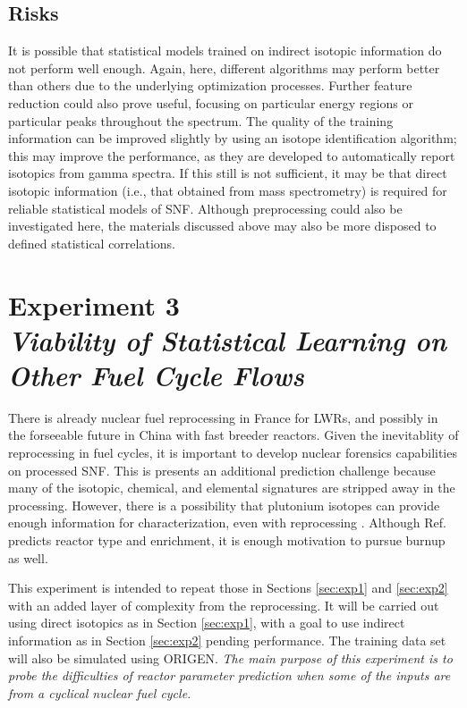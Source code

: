 \subsection*{Risks}

It is possible that statistical models trained on indirect isotopic information
do not perform well enough. Again, here, different algorithms may perform
better than others due to the underlying optimization processes. Further
feature reduction could also prove useful, focusing on particular energy
regions or particular peaks throughout the spectrum. The quality of the
training information can be improved slightly by using an isotope
identification algorithm; this may improve the performance, as they are
developed to automatically report isotopics from gamma spectra. If this still
is not sufficient, it may be that direct isotopic information (i.e., that
obtained from mass spectrometry) is required for reliable statistical models of
\gls{SNF}.  Although preprocessing could also be investigated here, the
materials discussed above may also be more disposed to defined statistical
correlations.

\section[Experiment 3: Other Fuel Cycle Flows]{Experiment 3\\ 
\large{\textit{Viability of Statistical Learning on Other Fuel Cycle Flows}}}
\label{sec:exp3}

There is already nuclear fuel reprocessing in France for \gls{LWR}s, and
possibly in the forseeable future in China with fast breeder reactors.  Given
the inevitablity of reprocessing in fuel cycles, it is important to develop
nuclear forensics capabilities on processed \gls{SNF}. This is presents an
additional prediction challenge because many of the isotopic, chemical, and
elemental signatures are stripped away in the processing. However, there is a
possibility that plutonium isotopes can provide enough information for
characterization, even with reprocessing \cite{pu_discrimination}. Although
Ref. \cite{pu_discrimination} predicts reactor type and enrichment, it is
enough motivation to pursue burnup as well. 

This experiment is intended to repeat those in Sections \ref{sec:exp1} and
\ref{sec:exp2} with an added layer of complexity from the reprocessing.  It
will be carried out using direct isotopics as in Section \ref{sec:exp1}, with a
goal to use indirect information as in Section \ref{sec:exp2} pending
performance. The training data set will also be simulated using \gls{ORIGEN}.
\textit{The main purpose of this experiment is to probe the difficulties of
reactor parameter prediction when some of the inputs are from a cyclical
nuclear fuel cycle.}

